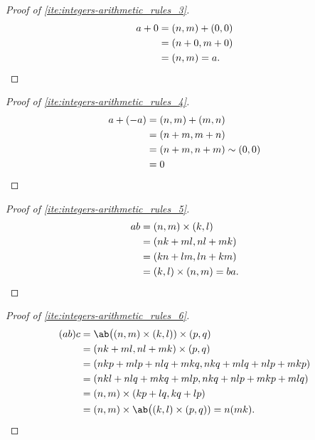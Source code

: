 \begin{proof}[Proof of \cref{ite:integers-arithmetic_rules_3}]
  \begin{align}
    a + 0 & = (n, m) + (0, 0)      \\
          & = (n + 0, m + 0)       \\
          & = (n, m) = a. \qedhere
  \end{align}
\end{proof}

\begin{proof}[Proof of \cref{ite:integers-arithmetic_rules_4}]
  \begin{align}
    a + (-a) & = (n, m) + (m, n)            \\
             & = (n + m, m + n)             \\
             & = (n + m, n + m) \sim (0, 0) \\
             & = 0 \qedhere
  \end{align}
\end{proof}

\begin{proof}[Proof of \cref{ite:integers-arithmetic_rules_5}]
  \begin{align}
    ab & = (n, m) \times (k, l)                \\
       & = (nk + ml, nl + mk)                  \\
       & = (kn + lm, ln + km)                  \\
       & = (k, l) \times (n, m) = ba. \qedhere
  \end{align}
\end{proof}

\begin{proof}[Proof of \cref{ite:integers-arithmetic_rules_6}]
  \begin{align}
    (ab)c & = \ab\big((n, m) \times (k, l)) \times (p, q)                   \\
          & = (nk + ml, nl + mk) \times (p, q)                              \\
          & = (nkp + mlp + nlq + mkq, nkq + mlq + nlp + mkp)                \\
          & = (nkl + nlq + mkq + mlp, nkq + nlp + mkp + mlq)                \\
          & = (n, m) \times (kp + lq, kq + lp)                              \\
          & = (n, m) \times \ab\big((k, l) \times (p, q)) = n(mk). \qedhere
  \end{align}
\end{proof}

